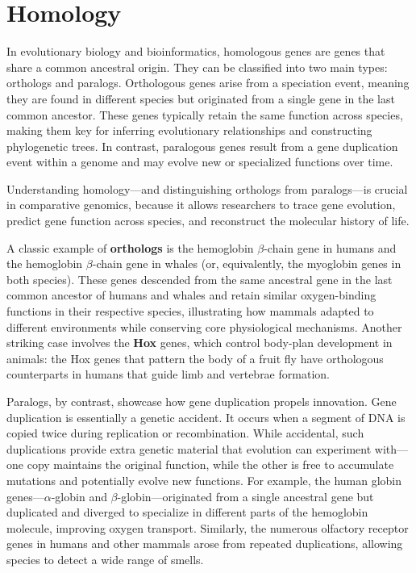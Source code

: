 \section{Homology}

In evolutionary biology 
and bioinformatics, homologous genes are genes that share a common ancestral origin. They can be classified into two main types: orthologs and paralogs. Orthologous genes arise from a speciation event, meaning they are found in different species but originated from a single gene in the last common ancestor. These genes typically retain the same function across species, making them key for inferring evolutionary relationships and constructing phylogenetic trees. In contrast, paralogous genes result from a gene duplication event within a genome and may evolve new or specialized functions over time. 

Understanding homology—and distinguishing orthologs from paralogs—is crucial in comparative genomics, because it allows researchers to trace gene evolution, predict gene function across species, and reconstruct the molecular history of life.

A classic example of \textbf{orthologs} is the hemoglobin $\beta$-chain gene in humans and the hemoglobin $\beta$-chain gene in whales (or, equivalently, the myoglobin genes in both species). These genes descended from the same ancestral gene in the last common ancestor of humans and whales and retain similar oxygen-binding functions in their respective species, illustrating how mammals adapted to different environments while conserving core physiological mechanisms. Another striking case involves the \textbf{Hox} genes, which control body-plan development in animals: the Hox genes that pattern the body of a fruit fly have orthologous counterparts in humans that guide limb and vertebrae formation.

Paralogs, by contrast, showcase how gene duplication propels innovation. Gene duplication is essentially a genetic accident. It occurs when a segment of DNA is copied twice during replication or recombination. While accidental, such duplications provide extra genetic material that evolution can experiment with—one copy maintains the original function, while the other is free to accumulate mutations and potentially evolve new functions. For example, the human globin genes—$\alpha$-globin and $\beta$-globin—originated from a single ancestral gene but duplicated and diverged to specialize in different parts of the hemoglobin molecule, improving oxygen transport. Similarly, the numerous olfactory receptor genes in humans and other mammals arose from repeated duplications, allowing species to detect a wide range of smells.

